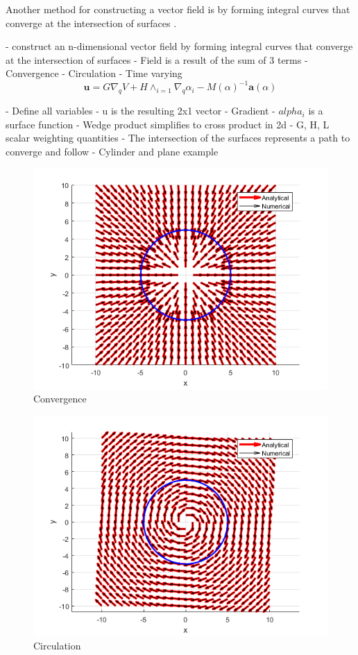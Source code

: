 \documentclass[numbered,pdftex]{ohio-etd}
\begin{document}
Another method for constructing a vector field is by forming integral curves that converge at the intersection of surfaces \cite{goncalves_artificial_2009}. 

- construct an n-dimensional vector field by forming integral curves that converge at the intersection of surfaces
- Field is a result of the sum of 3 terms
  - Convergence
  - Circulation
  - Time varying\\


\begin{equation}\label{gonFieldeq}
\boldsymbol{u} = G\nabla_qV+H\wedge_{i=1}\nabla_q\alpha_i - M(\alpha)^{-1}\boldsymbol{a}(\alpha)
\end{equation}

- Define all variables
	- u is the resulting 2x1 vector
	- Gradient
	- $alpha_i$ is a surface function
	- Wedge product simplifies to cross product in 2d
	- G, H, L scalar weighting quantities 
	- The intersection of the surfaces represents a path to converge and follow
	- Cylinder and plane example


\begin{figure}[h]
	\centering
	\includegraphics[width=0.7\linewidth]{PaperFigures/convergence}
	\caption{Convergence}
	\label{fig:convergence}
	
\end{figure}

\begin{figure}[h]
	\centering
	\includegraphics[width=0.7\linewidth]{PaperFigures/circulation}
	\caption{Circulation}
	\label{fig:circulation}
\end{figure}
\end{document}
